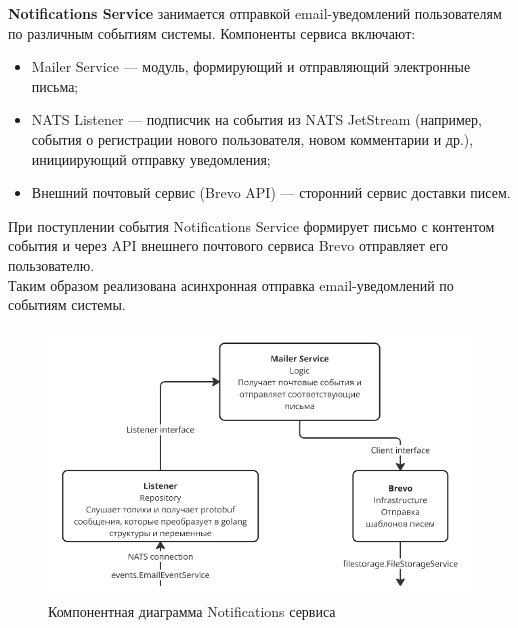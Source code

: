 \textbf{Notifications Service} занимается отправкой email-уведомлений пользователям по различным событиям системы. Компоненты сервиса включают:
\begin{itemize}
    \item Mailer Service — модуль, формирующий и отправляющий электронные письма;
    \item NATS Listener — подписчик на события из NATS JetStream (например, события о регистрации нового пользователя, новом комментарии и др.), инициирующий отправку уведомления;
    \item Внешний почтовый сервис (Brevo API) — сторонний сервис доставки писем.
\end{itemize}
При поступлении события Notifications Service формирует письмо с контентом события и через API внешнего почтового сервиса Brevo отправляет его пользователю. \\ Таким образом реализована асинхронная отправка email-уведомлений по событиям системы.
\begin{figure}[H]
        \centering
        \includegraphics[width=0.8\linewidth]{Images/second_chapter_backend_architecture/Picture7.png}
        \caption{Компонентная диаграмма Notifications сервиса}
        \label{fig:notifications-service-component-diagram}
\end{figure}

